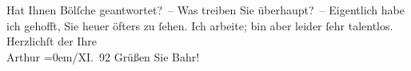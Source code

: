 \begin{ledgroupsized}[t]{13cm}
           \pstart
           {\pb}Hat Ihnen Bölſche
               geantwortet? –\pend
           \pstart
           Was treiben Sie überhaupt? –\pend
           \pstart
           Eigentlich habe ich gehofft, Sie heuer öfters zu ſehen. Ich arbeite; bin aber leider
               ſehr talentlos.\pend
           \pstart
           Herzlichſt der Ihre{\\[\baselineskip]}\spacefill\mbox{Arthur}\pend
           \leftskip=0em{}/XI. 92\pend
           \pstart
           Grüßen Sie Bahr!\pend
           
         
         \endnumbering{}\end{ledgroupsized}  \newcommand{\dateiname}{L00133}\newcommand{\titel}{Arthur Schnitzler an Hugo von Hofmannsthal, 9. 11. 1892}\newcommand{\editorInnen}{ Martin Anton Müller und Gerd-Hermann Susen}
      